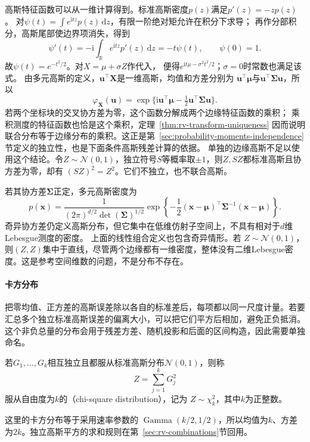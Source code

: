 高斯特征函数可以从一维计算得到。标准高斯密度\(p(z)\)满足\(p'(z)=-zp(z)\)。
对\(\psi(t)=\int e^{\mathrm itz}p(z)\,\mathrm dz\)，有限一阶绝对矩允许在积分下求导；
再作分部积分，高斯尾部使边界项消失，得到
\[
 \psi'(t)
 =-\mathrm i\int_{\mathbb R}e^{\mathrm itz}p'(z)\,\mathrm dz
 =-t\psi(t),\qquad \psi(0)=1.
\]
故\(\psi(t)=e^{-t^2/2}\)。对\(X=\mu+\sigma Z\)作代入，
便得\(e^{\mathrm it\mu-\sigma^2t^2/2}\)；\(\sigma=0\)时常数也满足该式。
由多元高斯的定义，\(\bm u^\top\bm X\)是一维高斯，均值和方差分别为
\(\bm u^\top\bm\mu\)与\(\bm u^\top\bm\Sigma\bm u\)，所以
\[
\varphi_{\bm X}(\bm u)
=\exp\{\mathrm i\bm u^\top\bm\mu-\tfrac12\bm u^\top\bm\Sigma\bm u\}.
\]
若两个坐标块的交叉协方差为零，这个函数分解成两个边缘特征函数的乘积；
乘积测度的特征函数也恰是这个乘积，定理~\ref{thm:rv-transform-uniqueness}
因而说明联合分布等于边缘分布的乘积。这正是第~\ref{sec:probability-moments-independence}节定义的独立性，也是下面条件高斯残差计算的依据。
单独的边缘高斯不足以使用这个结论。令\(Z\sim\mathcal N(0,1)\)，独立符号\(S\)等概率取\(\pm1\)，则\(Z,SZ\)都标准高斯且协方差为零，却有
\((SZ)^2=Z^2\)。它们不独立，也不联合高斯。

若其协方差\(\bm{\Sigma}\)正定，多元高斯密度为
\[
  p(\bm{x})
  =
  \frac{1}{(2\pi)^{d/2}\det(\bm{\Sigma})^{1/2}}
  \exp\left\{
    -\frac12
    (\bm{x}-\bm{\mu})^{\top}
    \bm{\Sigma}^{-1}
    (\bm{x}-\bm{\mu})
  \right\}.
\]
奇异协方差仍定义高斯分布，但它集中在低维仿射子空间上，不具有相对于\(d\)维Lebesgue测度的密度。
上面的线性组合定义也包含奇异情形。若
\(Z\sim\mathcal N(0,1)\)，则\((Z,Z)\)集中于直线，尽管两个边缘都有一维密度，整体没有二维Lebesgue密度。这是参考空间维数的问题，不是分布不存在。
\paragraph{卡方分布}
把零均值、正方差的高斯误差除以各自的标准差后，每项都以同一尺度计量。若要汇总多个独立标准高斯误差的偏离大小，可以把它们平方后相加，避免正负抵消。这个非负总量的分布会用于残差方差、随机投影和后面的区间构造，因此需要单独命名。
\begin{definition}[卡方分布]
  \label{def:probability-chi-square-distribution}
若\(G_1,\ldots,G_k\)相互独立且都服从标准高斯分布\(\mathcal N(0,1)\)，则称
\[
  Z=\sum_{j=1}^{k}G_j^2
\]
服从自由度为\(k\)的（chi-square distribution），记为
\(Z\sim\chi_k^2\)，其中\(k\)为正整数。
\end{definition}
这里的卡方分布等于采用速率参数的
\(\operatorname{Gamma}(k/2,1/2)\)，所以均值为\(k\)、方差为\(2k\)。独立高斯平方的求和规则在第~\ref{sec:rv-combinations}节回用。

